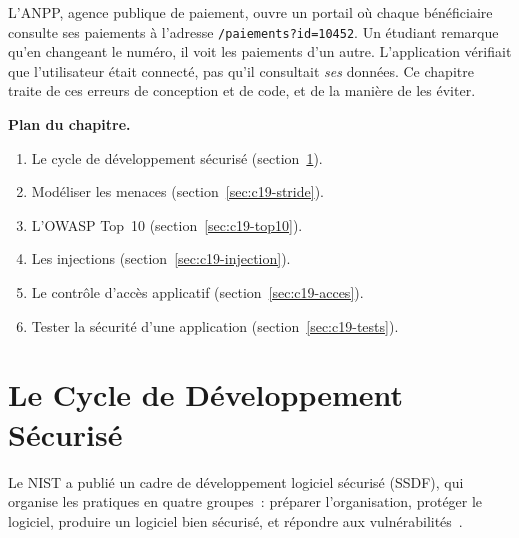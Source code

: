 L'ANPP, agence publique de paiement, ouvre un portail où chaque
bénéficiaire consulte ses paiements à l'adresse
\texttt{/paiements?id=10452}. Un étudiant remarque qu'en changeant le
numéro, il voit les paiements d'un autre. L'application vérifiait que
l'utilisateur était connecté, pas qu'il consultait \emph{ses} données. Ce
chapitre traite de ces erreurs de conception et de code, et de la manière
de les éviter.

\medskip
\textbf{Plan du chapitre.}
\begin{enumerate}
    \item Le cycle de développement sécurisé (section~\ref{sec:c19-ssdlc}).
    \item Modéliser les menaces (section~\ref{sec:c19-stride}).
    \item L'OWASP Top~10 (section~\ref{sec:c19-top10}).
    \item Les injections (section~\ref{sec:c19-injection}).
    \item Le contrôle d'accès applicatif (section~\ref{sec:c19-acces}).
    \item Tester la sécurité d'une application (section~\ref{sec:c19-tests}).
\end{enumerate}

\separateur

\section{Le Cycle de Développement Sécurisé}
\label{sec:c19-ssdlc}

Le NIST a publié un cadre de développement logiciel sécurisé (SSDF), qui
organise les pratiques en quatre groupes~: préparer l'organisation,
protéger le logiciel, produire un logiciel bien sécurisé, et répondre aux
vulnérabilités~\cite{nist800218}.

